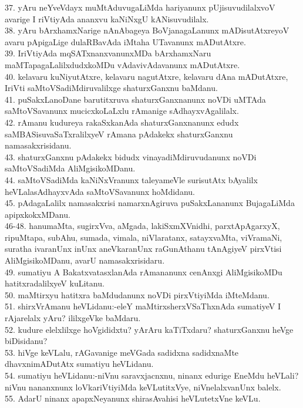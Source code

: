 \documentclass{article}
\begin{document}
37. yAru neYveVdayx muMtAduvugaLiMda hariyanunx pUjisuvudilalxvoV avarige I riVtiyAda ananxvu kaNiNxgU kANisuvudilalx.\\
38. yAru bArxhamxNarige nAnAbageya BoVjanagaLanunx mADisutAtxreyoV avaru pApigaLige dulaRBavAda iMtaha UTavanunx mADutAtxre.\\
39. IriVtiyAda mqSATxnanxvanunxMDa bArxhamxNaru maMTapagaLalilxdudxkoMDu vAdavivAdavanunx mADutAtxre.\\
40. kelavaru kuNiyutAtxre, kelavaru nagutAtxre, kelavaru dAna mADutAtxre, IriVti saMtoVSadiMdiruvalilxge shaturxGanxnu baMdanu.\\
41. puSakxLanoDane barutitxruva shaturxGanxnanunx noVDi uMTAda saMtoVSavanunx mucicxkoLaLxlu rAmanige sAdhayxvAgalilalx.\\
42. rAmanu kudureya rakaSxkanAda shaturxGanxnanunx edudx saMBASisuvaSaTxralilxyeV rAmana pAdakekx shaturxGanxnu namasakxrisidanu.\\
43. shaturxGanxnu pAdakekx bidudx vinayadiMdiruvudanunx noVDi saMtoVSadiMda AliMgisikoMDanu.\\
44. saMtoVSadiMda kaNiNxVranunx taleyameVle surisutAtx bAyalilx heVLalasAdhayxvAda saMtoVSavanunx hoMdidanu.\\
45. pAdagaLalilx namasakxrisi namarxnAgiruva puSakxLananunx BujagaLiMda apipxkokxMDanu.\\
46-48. hanumaMta, sugirxVva, aMgada, lakiSxmXVnidhi, parxtApAgarxyX, ripuMtapa, subAhu, sumada, vimala, niVlaratanx, satayxvaMta, viVramaNi, suratha ivaranUnx inUnx aneVkaranUnx raGunAthanu tAnAgiyeV pirxVtisi AliMgisikoMDanu, avarU namasakxrisidaru.\\
49. sumatiyu A BakatxvatasxlanAda rAmananunx cenAnxgi AliMgisikoMDu hatitxradalilxyeV kuLitanu.\\
50. maMtirxyu hatitxra baMdudanunx noVDi pirxVtiyiMda iMteMdanu.\\
51. shirxVrAmanu heVLidanu:-eleY maMtirxsherxVSaThxnAda sumatiyeV I rAjarelalx yAru? ililxgeVke baMdaru.\\
52. kudure elelxlilxge hoVgididxtu? yArAru kaTiTxdaru? shaturxGanxnu heVge biDisidanu?\\
53. hiVge keVLalu, rAGavanige meVGada sadidxna sadidxnaMte dhavxnimADutAtx sumatiyu heVLidanu.\\
54. sumatiyu heVLidanu:-niVnu saravxjacnxnu, ninanx edurige EneMdu heVLali? niVnu nananxnunx loVkariVtiyiMda keVLutitxVye, niVnelalxvanUnx balelx.\\
55. AdarU ninanx apapxNeyanunx shirasAvahisi heVLutetxVne keVLu.\\
\end{document}

